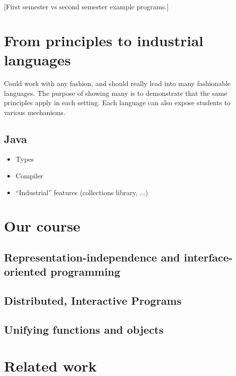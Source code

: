 \documentclass[submission,copyright]{eptcs}
\begin{document}
[First semester vs second semester example programs.]

\section{From principles to industrial languages}
\label{sec:industrial}

Could work with any fashion, and should really lead into many
fashionable languages.  The purpose of showing many is to demonstrate
that the same principles apply in each setting.  Each language can also
expose students to various mechanisms.

\subsection{Java}

\begin{itemize}
\item Types
\item Compiler
\item ``Industrial'' features (collections library, ...)
\end{itemize}



\section{Our course}
\label{sec:our-course}

\subsection{Representation-independence and interface-oriented programming}

\subsection{Distributed, Interactive Programs}

\subsection{Unifying functions and objects}


\section{Related work}
\label{sec:related-work}

\cite{dvanhorn:Gray2003ProfessorJ}
\end{document}
